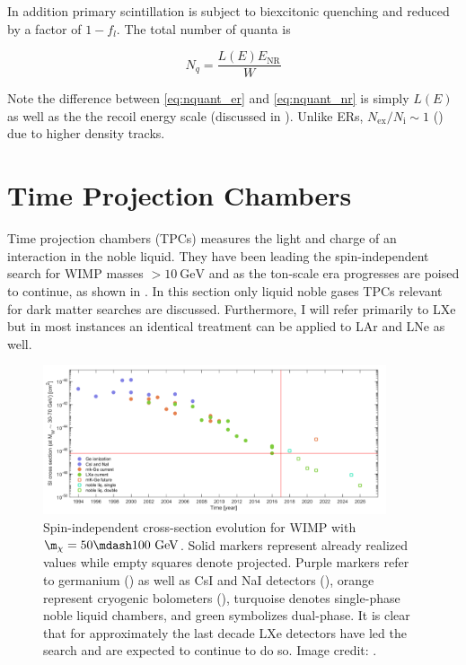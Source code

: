 In addition primary scintillation is subject to biexcitonic quenching and reduced by a factor of $1 - f_{l}$.  The total number of quanta
is

\begin{equation}
N_{q} = \frac{L(E) E_{\mathrm{NR}}}{W}
\label{eq:nquant_nr}
\end{equation}

\noindent Note the difference between \eqref{eq:nquant_er} and \eqref{eq:nquant_nr} is simply $L(E)$ as well as the the recoil energy
scale (discussed in ).  Unlike ERs, $N_{\mathrm{ex}} / N_{\mathrm{i}} \sim 1$ () due to
higher density tracks.



\section{Time Projection Chambers}
\label{sec:tpcs}
Time projection chambers (TPCs) measures the light and charge of an interaction in the noble liquid.  They have been leading the
spin-independent search for WIMP masses $> 10\ \mathrm{GeV}$ and as the ton-scale era progresses are poised to continue, as shown in
.  In this section
only liquid noble gases TPCs relevant for dark matter searches are discussed.  Furthermore, I will refer primarily to LXe but in
most instances an identical treatment can be applied to LAr and LNe as well.

\begin{figure}
\centering
\includegraphics[width=0.9\textwidth]{SensitivityEvolutionBetter}
\caption{Spin-independent cross-section evolution for WIMP with $\m_{\chi} = 50 \mdash 100\ \mathrm{GeV}$.  Solid markers represent
already realized
values while empty squares denote projected.  Purple markers refer to germanium () as well as CsI and NaI
detectors (), orange represent cryogenic bolometers (), turquoise denotes single-phase
noble liquid chambers, and green symbolizes dual-phase.  It is
clear that for approximately the last decade LXe detectors have led the search and are
expected to continue to do so.  Image credit: .}
\label{fig:sensitivity_evo}
\end{figure}

